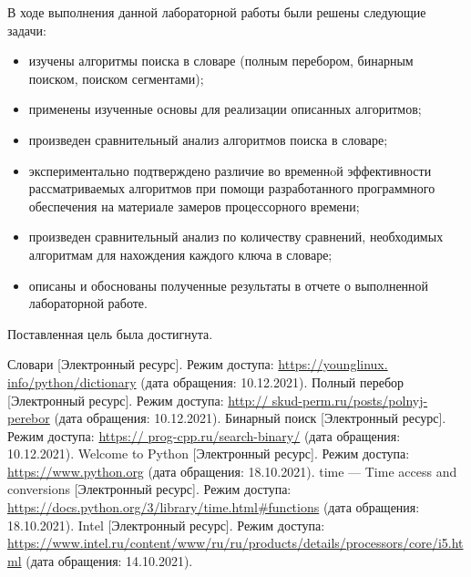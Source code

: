 \documentclass[a4paper,14pt, unknownkeysallowed]{extreport}
\begin{document}
В ходе выполнения данной лабораторной работы были решены следующие задачи:
\begin{itemize}
	\item изучены алгоритмы поиска в словаре (полным перебором, бинарным поиском, поиском сегментами);
	\item применены изученные основы для реализации описанных алгоритмов;
	\item произведен сравнительный анализ алгоритмов поиска в словаре;
	\item экспериментально подтверждено различие во временнoй эффективности рассматриваемых алгоритмов при помощи разработанного программного обеспечения на материале замеров процессорного времени;
	\item произведен сравнительный анализ по количеству сравнений, необходимых алгоритмам для нахождения каждого ключа в словаре;
	\item описаны и обоснованы полученные результаты в отчете о выполненной лабораторной работе.
\end{itemize}

Поставленная цель была достигнута.





\begin{thebibliography}{5}
	Словари [Электронный ресурс]. Режим доступа: \url{https://younglinux. info/python/dictionary} (дата обращения: 10.12.2021).
	Полный перебор [Электронный ресурс]. Режим доступа: \url{http:// skud-perm.ru/posts/polnyj-perebor} (дата обращения: 10.12.2021).
	Бинарный поиск [Электронный ресурс]. Режим доступа: \url{https:// prog-cpp.ru/search-binary/} (дата обращения: 10.12.2021).
	Welcome to Python [Электронный ресурс]. Режим доступа: \url{https://www.python.org} (дата обращения: 18.10.2021).
	time — Time access and conversions [Электронный ресурс]. Режим доступа: \url{https://docs.python.org/3/library/time.html#functions} (дата обращения: 18.10.2021).
	Intel [Электронный ресурс]. Режим доступа: \url{https://www.intel.ru/content/www/ru/ru/products/details/processors/core/i5.html} (дата обращения: 14.10.2021).
\end{thebibliography}

\end{document}
